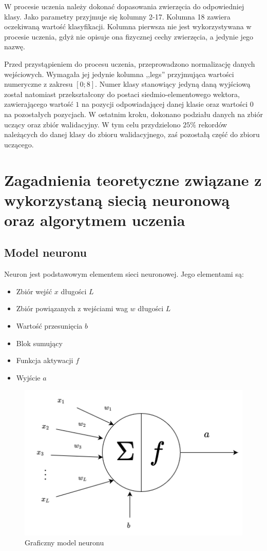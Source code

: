 \documentclass[12pt,twoside]{article}
\begin{document}
W procesie uczenia należy dokonać dopasowania zwierzęcia do odpowiedniej klasy.
Jako parametry przyjmuje się kolumny 2-17.
Kolumna 18 zawiera oczekiwaną wartość klasyfikacji.
Kolumna pierwsza nie jest wykorzystywana w procesie uczenia, gdyż nie opisuje ona fizycznej cechy zwierzęcia, a jedynie jego nazwę.

Przed przystąpieniem do procesu uczenia, przeprowadzono normalizację danych wejściowych. Wymagała jej jedynie kolumna ,,legs'' przyjmująca wartości numeryczne z zakresu $[0;8]$.
Numer klasy stanowiący jedyną daną wyjściową został natomiast przekształcony do postaci siedmio-elementowego wektora, zawierającego wartość $1$ na pozycji odpowiadającej danej klasie oraz wartości $0$ na pozostałych pozycjach.
W ostatnim kroku, dokonano podziału danych na zbiór uczący oraz zbiór walidacyjny.
W tym celu przydzielono $25\%$ rekordów należących do danej klasy do zbioru walidacyjnego, zaś pozostałą część do zbioru uczącego.

\section{Zagadnienia teoretyczne związane z wykorzystaną siecią neuronową oraz algorytmem uczenia}
\subsection{Model neuronu}
Neuron jest podstawowym elementem sieci neuronowej.
Jego elementami są:
\begin{itemize}
	\item Zbiór wejść $x$ długości $L$
	\item Zbiór powiązanych z wejściami wag $w$ długości $L$
	\item Wartość przesunięcia $b$
	\item Blok sumujący
	\item Funkcja aktywacji $f$
	\item Wyjście $a$
\end{itemize}


\begin{figure}[ht]
	\centering
	\includegraphics[width=12cm]{figures/models/neuronModel.png}
	\caption{Graficzny model neuronu}
	\label{Fig:neuron}
\end{figure}
\end{document}
